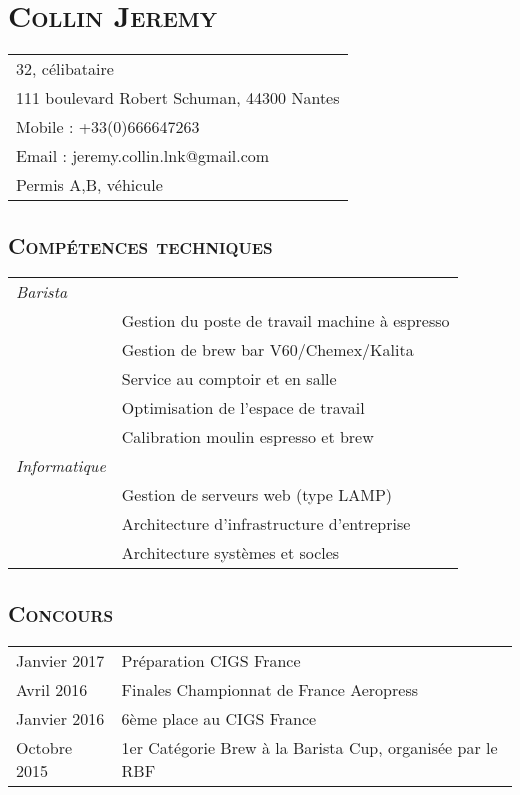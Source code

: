 \documentclass[a4paper]{article}
\newcommand{\hsection}[1]{\section*{\fontfamily{phv}\selectfont\textsc{#1}}}
\newcommand{\hsubsection}[1]{\subsection*{\fontfamily{phv}\selectfont\textsc{#1}}}
\begin{document}
\selectfont
\hsection{Collin Jeremy}
\begin{tabular}{p{16.5cm}}
\hline
32, célibataire\\
111 boulevard Robert Schuman, 44300 Nantes\\
Mobile : +33(0)666647263\\
Email : jeremy.collin.lnk@gmail.com\\
Permis A,B, véhicule\\
\end{tabular}
\hsubsection{Compétences techniques}
\begin{tabular}{P{3.5cm}|p{13cm}}
\textsl{Barista}	&  \\
 & Gestion du poste de travail machine à espresso\\
 & Gestion de brew bar V60/Chemex/Kalita\\
 & Service au comptoir et en salle\\
 & Optimisation de l’espace de travail\\
 & Calibration moulin espresso et brew\\

\textsl{Informatique} & \\
 & Gestion de serveurs web (type LAMP)\\
 & Architecture d’infrastructure d’entreprise \\
 & Architecture systèmes et socles\\
\end{tabular}

\hsubsection{Concours}
\begin{tabular}{P{3.5cm}|p{13cm}}
Janvier 2017  & Préparation CIGS France\\
Avril 2016	& Finales Championnat de France Aeropress\\
Janvier 2016	& 6ème place au CIGS France\\
Octobre 2015	& 1er Catégorie Brew à la Barista Cup, organisée par le RBF\\
\end{tabular}
\end{document}
